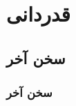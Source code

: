 \label{final_words}

\section{قدردانی}
\subsection{سخن آخر}
\begin{frame}
\frametitle{سخن آخر}

\pause
\begin{center}
{\nst \fontsize{6}{7.2}\selectfont {
با سپاس از سروران گرامی؛
}}
\end{center}

\end{frame}
